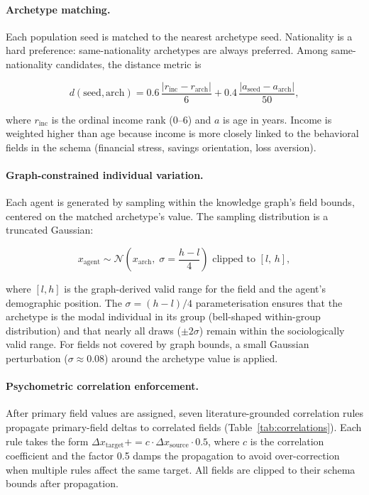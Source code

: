\documentclass[a4paper,12pt]{article}
\begin{document}
\paragraph{Archetype matching.}
Each population seed is matched to the nearest archetype seed. Nationality
is a hard preference: same-nationality archetypes are always preferred.
Among same-nationality candidates, the distance metric is

\begin{equation}
  d(\text{seed}, \text{arch}) = 0.6\,\frac{|r_\text{inc} - r_\text{arch}|}{6}
                              + 0.4\,\frac{|a_\text{seed} - a_\text{arch}|}{50},
  \label{eq:match}
\end{equation}

where $r_\text{inc}$ is the ordinal income rank (0--6) and $a$ is age in years.
Income is weighted higher than age because income is more closely linked to
the behavioral fields in the schema (financial stress, savings orientation,
loss aversion).

\paragraph{Graph-constrained individual variation.}
Each agent is generated by sampling within the knowledge graph's field bounds,
centered on the matched archetype's value. The sampling distribution is a
truncated Gaussian:

\begin{equation}
  x_\text{agent} \sim \mathcal{N}\!\left(x_\text{arch},\;
                       \sigma = \frac{h - l}{4}\right)
                  \text{ clipped to } [l,\, h],
  \label{eq:sampling}
\end{equation}

where $[l, h]$ is the graph-derived valid range for the field and the
agent's demographic position. The $\sigma = (h - l)/4$ parameterisation
ensures that the archetype is the modal individual in its group (bell-shaped
within-group distribution) and that nearly all draws ($\pm 2\sigma$) remain
within the sociologically valid range. For fields not covered by graph
bounds, a small Gaussian perturbation ($\sigma \approx 0.08$) around the
archetype value is applied.

\paragraph{Psychometric correlation enforcement.}
After primary field values are assigned, seven literature-grounded
correlation rules propagate primary-field deltas to correlated fields
(Table~\ref{tab:correlations}). Each rule takes the form
$\Delta x_\text{target} += c \cdot \Delta x_\text{source} \cdot 0.5$,
where $c$ is the correlation coefficient and the factor 0.5 damps the
propagation to avoid over-correction when multiple rules affect the same
target. All fields are clipped to their schema bounds after propagation.
\end{document}
